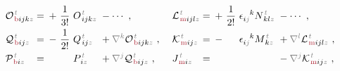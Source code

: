 \begin{subequations} \label{eq:multipole}
\begin{align}
	&{\mathcal{O}}^{\;\!\mathcolor{gray}{t}}_{\;\!\textcolor{Maroon}{\text{b}} ijk \mathcolor{gray}{z}} \hspace{-1em}&&=\hspace{0.2em} +~ \frac{1}{3!}~ O^{\;\!\mathcolor{gray}{t}}_{\;\! ijk\mathcolor{gray}{z}} &&\hspace{-0.7em}- \cdots~, &&\hspace{0.3em} {\mathcal{L}}^{\;\!\mathcolor{gray}{t}}_{\;\!\textcolor{Maroon}{\text{m}} ijl \mathcolor{gray}{z}} \hspace{-1em}&&=\hspace{0.2em} +~ \frac{1}{2!}~ \epsilon^{\hphantom{ij}k}_{i\mathcolor{gray}{j}} N^{\;\!\mathcolor{gray}{t}}_{\;\! kl\mathcolor{gray}{z}} &&\hspace{-0.7em}- \cdots~, \label{eq:Ob-Lm} \\
	&{\mathcal{Q}}^{\;\!\mathcolor{gray}{t}}_{\;\!\textcolor{Maroon}{\text{b}} ij \mathcolor{gray}{z}} \hspace{-1em}&&=\hspace{0.2em} -~ \frac{1}{2!}~ Q^{\;\!\mathcolor{gray}{t}}_{\;\! ij\mathcolor{gray}{z}} &&\hspace{-0.7em}+ \mathcolor{gray}{\nabla^k} {\mathcal{O}}^{\;\!\mathcolor{gray}{t}}_{\;\!\textcolor{Maroon}{\text{b}} ijk \mathcolor{gray}{z}}~,  &&\hspace{0.3em} {\mathcal{K}}^{\;\!\mathcolor{gray}{t}}_{\;\!\textcolor{Maroon}{\text{m}} ij \mathcolor{gray}{z}} \hspace{-1em}&&=\hspace{0.2em} -~ \hphantom{\frac{1}{2!}}~ \epsilon^{\hphantom{ij}k}_{i\mathcolor{gray}{j}} M^{\;\!\mathcolor{gray}{t}}_{\;\! k\mathcolor{gray}{z}} &&\hspace{-0.7em}+ \mathcolor{gray}{\nabla^l} {\mathcal{L}}^{\;\!\mathcolor{gray}{t}}_{\;\!\textcolor{Maroon}{\text{m}} ijl \mathcolor{gray}{z}}~, \label{eq:Qb-Km} \\
	&{\mathcal{P}}^{\;\!\mathcolor{gray}{t}}_{\;\!\textcolor{Maroon}{\text{b}} i \mathcolor{gray}{z}} \hspace{-1em}&&=\hspace{0.2em} ~ \hphantom{+\frac{1}{2!}}~ P^{\;\!\mathcolor{gray}{t}}_{\;\! i\mathcolor{gray}{z}} &&\hspace{-0.7em}+ \mathcolor{gray}{\nabla^j} {\mathcal{Q}}^{\;\!\mathcolor{gray}{t}}_{\;\!\textcolor{Maroon}{\text{b}} ij \mathcolor{gray}{z}}~, &&\hspace{0.3em} {J}^{\;\!\mathcolor{gray}{t}}_{\;\!\textcolor{Maroon}{\text{m}} i \mathcolor{gray}{z}} \hspace{-1em}&&=\hspace{0.2em} &&\hspace{-0.7em}- \mathcolor{gray}{\nabla^j} {\mathcal{K}}^{\;\!\mathcolor{gray}{t}}_{\;\!\textcolor{Maroon}{\text{m}} ij \mathcolor{gray}{z}}~, \label{eq:Pb-Jm} \\

\end{align}
\end{subequations}
